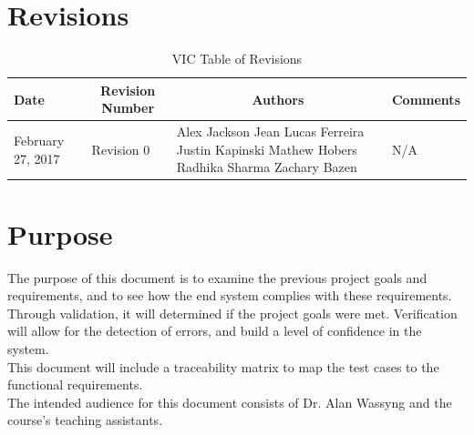 \documentclass [10pt]{article}
\begin{document}
\section{Revisions}
\begin{longtable}{| p{ } | p{ } | p{ } | p{ } |} \caption{VIC Table of Revisions}  \\

\hline 
\centering \textbf{Date} & 
\multicolumn{1}{c|}{\textbf {Revision Number}} &
\multicolumn{1}{c|}{\textbf {Authors}} & 
\multicolumn{1}{c|}{\textbf {Comments}} \\ \hline

\multirow{4}{*}{\centering February 27, 2017}  & 
\multirow{4}{*}{Revision 0}& 
{Alex Jackson \newline
Jean Lucas Ferreira \newline
Justin Kapinski\newline
Mathew Hobers\newline
Radhika Sharma\newline
Zachary Bazen}
&
 \multirow{4}{*}{N/A} \\ 
\hline 


\end{longtable}
\pagebreak






\section {Purpose}
The purpose of this document is to examine the previous project goals and requirements, and to see how the end system complies with these requirements.  Through validation, it will determined if the project goals were met. Verification will allow for the detection of errors, and build a level of confidence in the system.\\

This document will include a traceability matrix to map the test cases to the functional requirements.   \\


The intended audience for this document consists of Dr. Alan Wassyng and the course's teaching assistants.
\end{document}
